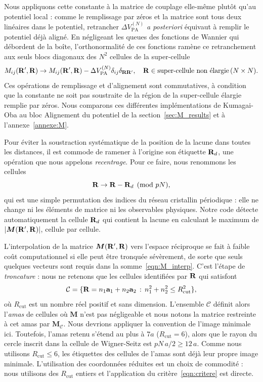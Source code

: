 Nous appliquons cette constante à la matrice de couplage elle-même plutôt qu'au potentiel local : comme le remplissage par zéros et la matrice sont tous deux linéaires dans le potentiel, retrancher $\Delta V_\text{PA}^{(N)}$ \textit{a posteriori} équivaut à remplir le potentiel déjà aligné. En négligeant les queues des fonctions de Wannier qui débordent de la boîte, l'orthonormalité de ces fonctions ramène ce retranchement aux seuls blocs diagonaux des $N^2$ cellules de la super-cellule
\begin{equation}
    M_{ij}(\mathbf{R}',\mathbf{R})\to M_{ij}(\mathbf{R}',\mathbf{R}) - \Delta V_\text{PA}^{(N)}\delta_{ij}\delta_{\mathbf{R}\mathbf{R}'},\quad \mathbf{R}\in\text{super-cellule non élargie}\,(N\times N).\label{eqn:alignement_W}
\end{equation}
Ces opérations de remplissage et d'alignement sont commutatives, à condition que la constante ne soit pas soustraite de la région de la super-cellule élargie remplie par zéros. Nous comparons ces différentes implémentations de Kumagai-Oba au bloc \og Alignement du potentiel \fg{} de la section~\ref{sec:M_results} et à l'annexe~\ref{annexe:M}.

\bigskip
{}

Pour éviter la soustraction systématique de la position de la lacune dans toutes les distances, il est commode de ramener à l'origine son étiquette $\mathbf{R}_d$, une opération que nous appelons \textit{recentrage}. Pour ce faire, nous renommons les cellules
\begin{equation}
    \mathbf{R}\to\mathbf{R}-\mathbf{R}_d \pmod{pN},\label{eqn:M_recentrage}
\end{equation}
qui est une simple permutation des indices du réseau cristallin périodique : elle ne change ni les éléments de matrice ni les observables physiques. Notre code détecte automatiquement la cellule $\mathbf{R}_d$ qui contient la lacune en calculant le maximum de $|\bm M(\mathbf{R}',\mathbf{R})|$, cellule par cellule.

L'interpolation de la matrice $\bm M(\mathbf{R}',\mathbf{R})$ vers l'espace réciproque se fait à faible coût computationnel si elle peut être tronquée sévèrement, de sorte que seuls quelques vecteurs sont requis dans la somme~\eqref{eqn:M_interp}. C'est l'étape de \textit{troncature} : nous ne retenons que les cellules identifiées par $\mathbf{R}$ qui satisfont
\begin{equation}
    \mathcal{C} = \{\mathbf{R} = n_1\mathbf{a}_1+n_2\mathbf{a}_2\,:\,n_1^2+n_2^2\leq R_\text{cut}^2\},\label{eqn:critere}
\end{equation}
où $R_\text{cut}$ est un nombre réel positif et sans dimension. L'ensemble $\mathcal{C}$ définit alors l'\textit{amas} de cellules où $\bm M$ n'est pas négligeable et nous notons la matrice restreinte à cet amas par $\bm M_\mathcal{C}$. Nous devrions appliquer la convention de l'image minimale ici. Toutefois, l'amas retenu s'étend au plus à $7a$ ($R_\text{cut}=6$), alors que le rayon du cercle inscrit dans la cellule de Wigner-Seitz est $pN\,a/2\geq 12\,a$. Comme nous utilisons $R_\text{cut}\leq 6$, les étiquettes des cellules de l'amas sont déjà leur propre image minimale. L'utilisation des coordonnées réduites est un choix de commodité : nous utilisons des $R_\text{cut}$ entiers et l'application du critère~\eqref{eqn:critere} est directe.

